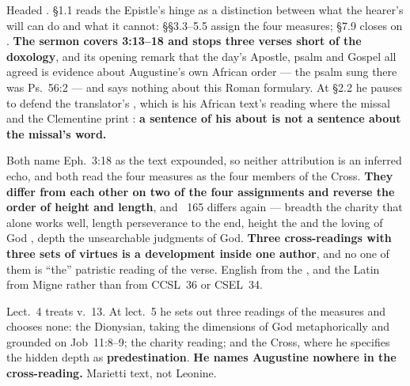 \begin{witnessnote}
 Headed . \S1.1 reads
the Epistle's hinge as a distinction between what the hearer's will can do and
what it cannot:  \S\S3.3--5.5 assign
the four measures; \S7.9 closes on . \textbf{The sermon covers 3:13--18 and
stops three verses short of the doxology}, and its opening remark that the
day's Apostle, psalm and Gospel all agreed  is evidence about Augustine's own African order --- the psalm
sung there was Ps.~56:2 --- and says nothing about this Roman formulary. At
\S2.2 he pauses to defend the translator's , which is his
African text's reading where the missal and the Clementine print
: \textbf{a sentence of his about  is not a
sentence about the missal's word.}
\end{witnessnote}

\begin{witnessnote}
 Both name Eph.~3:18 as the text
expounded, so neither attribution is an inferred echo, and both read the four
measures as the four members of the Cross. \textbf{They differ from each other
on two of the four assignments and reverse the order of height and length}, and
~165 differs again --- breadth the charity that alone works well,
length perseverance to the end, height the  and the loving of
God , depth the unsearchable judgments of God. \textbf{Three
cross-readings with three sets of virtues is a development inside one author},
and no one of them is ``the'' patristic reading of the verse. English from the
, and the Latin from Migne rather than
from CCSL~36 or CSEL~34.
\end{witnessnote}

\begin{witnessnote}
 Lect.~4 treats v.~13. At lect.~5 he sets out three readings of the
measures and chooses none: the Dionysian, taking the dimensions of God
metaphorically and grounded on Job~11:8--9; the charity reading; and the Cross,
where he specifies the hidden depth as \textbf{predestination}. \textbf{He
names Augustine nowhere in the cross-reading.} Marietti text, not Leonine.
\end{witnessnote}


